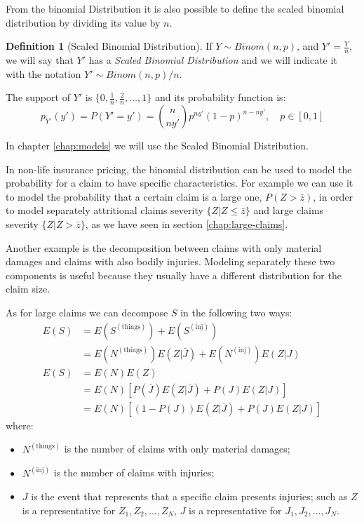 \documentclass[a4paper, twoside, openright, 12pt]{report}
\providecommand{\tightlist}{%
  \setlength{\itemsep}{0pt}\setlength{\parskip}{0pt}}
\theoremstyle{definition}
\newtheorem{definition}{Definition}[chapter]
\theoremstyle{definition}
\theoremstyle{definition}
\theoremstyle{remark}
\begin{document}
From the binomial Distribution it is also possible to define the scaled binomial distribution by dividing its value by \(n\).

\begin{definition}[Scaled Binomial Distribution]
\label{def:def-scaled-binomial} \iffalse (Scaled Binomial Distribution) \fi{} If \(Y\sim Binom(n, p)\), and \(Y' = \frac{Y}{n}\), we will say that \(Y'\) has a \textit{Scaled Binomial Distribution} and we will indicate it with the notation \(Y' \sim Binom(n, p)/n\).

The support of \(Y'\) is \(\{0, \frac{1}{n}, \frac{2}{n}, \dots, 1 \}\) and its probability function is:
\[
p_{Y'}(y') = P\left( Y' = y' \right) = \binom{n}{ny'} p^{ny'} (1-p)^{n-ny'}, \quad p \in [0, 1]
\]
\end{definition}

In chapter \ref{chap:models} we will use the Scaled Binomial Distribution.

In non-life insurance pricing, the binomial distribution can be used to model the probability for a claim to have specific characteristics. For example we can use it to model the probability that a certain claim is a large one, \(P(Z>\bar{z})\), in order to model separately attritional claims severity \(\{Z|Z\le\bar{z}\}\) and large claims severity \(\{Z|Z>\bar{z}\}\), as we have seen in section \ref{chap:large-claims}.

Another example is the decomposition between claims with only material damages and claims with also bodily injuries. Modeling separately these two components is useful because they usually have a different distribution for the claim size.

As for large claims we can decompose \(S\) in the following two ways:
\begin{align}
  \nonumber
  E(S) & = E(S^{(\text{things})}) + E(S^{(\text{inj})}) \\
    \label{inj-claim-decomposition-expected-1}
    & = E(N^{(\text{things})}) E(Z|\bar{J}) + E(N^{(\text{inj})}) E(Z|J) \\[12pt]
  \nonumber
  E(S) & = E(N) E(Z) \\
    \nonumber
    & = E(N) \left[P(\bar{J}) E(Z|\bar{J}) + P(J) E(Z|J) \right] \\
    \label{inj-claim-decomposition-expected-2}
    & = E(N) \left[\left( 1 - P(J) \right) E(Z|\bar{J}) + P(J) E(Z|J)\right]
\end{align}
where:

\begin{itemize}
\tightlist
\item
  \(N^{(\text{things})}\) is the number of claims with only material damages;
\item
  \(N^{(\text{inj})}\) is the number of claims with injuries;
\item
  \(J\) is the event that represents that a specific claim presents injuries; such as \(Z\) is a representative for \(Z_1, Z_2, \dots, Z_N\), \(J\) is a representative for \(J_1, J_2, \dots, J_N\).
\end{itemize}
\end{document}

